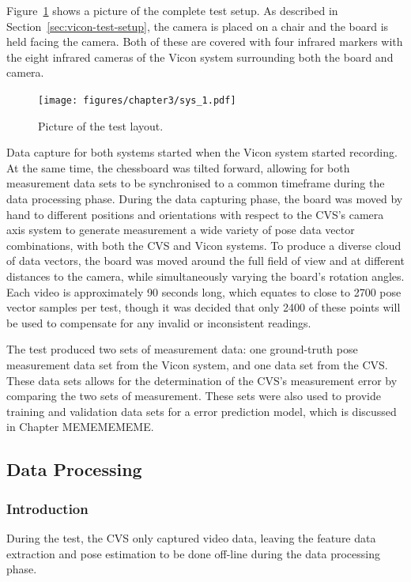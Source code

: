 Figure~\ref{fig:chap3-pic-sys-layout} shows a picture of the complete test setup. As described in Section~\ref{sec:vicon-test-setup}, the camera is placed on a chair and the board is held facing the camera. Both of these are covered with four infrared markers with the eight infrared cameras of the Vicon system surrounding both the board and camera.  

\begin{figure}
  \centering
  \texttt{[image: figures/chapter3/sys\_1.pdf]}
  \caption{Picture of the test layout.}
\label{fig:chap3-pic-sys-layout}
\end{figure}

Data capture for both systems started when the Vicon system started recording. At the same time, the chessboard was tilted forward, allowing for both measurement data sets to be synchronised to a common timeframe during the data processing phase. During the data capturing phase, the board was moved by hand to different positions and orientations with respect to the CVS's camera axis system to generate measurement a wide variety of pose data vector combinations, with both the CVS and Vicon systems. To produce a diverse cloud of data vectors, the board was moved around the full field of view and at different distances to the camera, while simultaneously varying the board's rotation angles. Each video is approximately 90 seconds long, which equates to close to 2700 pose vector samples per test, though it was decided that only 2400 of these points will be used to compensate for any invalid or inconsistent readings. 

The test produced two sets of measurement data: one ground-truth pose measurement data set from the Vicon system, and one data set from the CVS\@. These data sets allows for the determination of the CVS's measurement error by comparing the two sets of measurement. These sets were also used to provide training and validation data sets for a error prediction model, which is discussed in Chapter MEMEMEMEME.\@

\subsection{Data Processing}

\subsubsection{Introduction}

During the test, the CVS only captured video data, leaving the feature data extraction and pose estimation to be done off-line during the data processing phase. 

